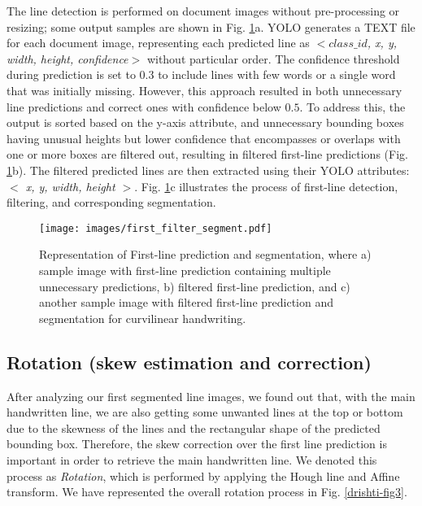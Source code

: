 \documentclass[runningheads]{llncs}
\begin{document}
The line detection is performed on document images without pre-processing or resizing; some output samples are shown in Fig. \ref{drishti-fig2}a. YOLO generates a TEXT file for each document image, representing each predicted line as \textit{$<$$class\_id$, x, y, width, height, confidence$>$} without particular order. The confidence threshold during prediction is set to $0.3$ to include lines with few words or a single word that was initially missing. However, this approach resulted in both unnecessary line predictions and correct ones with confidence below $0.5$. To address this, the output is sorted based on the y-axis attribute, and unnecessary bounding boxes having unusual heights but lower confidence that encompasses or overlaps with one or more boxes are filtered out, resulting in filtered first-line predictions (Fig. \ref{drishti-fig2}b). The filtered predicted lines are then extracted using their YOLO attributes: \textit{$<$ x, y, width, height $>$}. Fig. \ref{drishti-fig2}c illustrates the process of first-line detection, filtering, and corresponding segmentation.

\begin{figure}
\texttt{[image: images/first\_filter\_segment.pdf]}
\vspace{-4mm}
\caption{Representation of First-line prediction and segmentation, where a) sample image with first-line prediction containing multiple unnecessary predictions, b) filtered first-line prediction, and c) another sample image with filtered first-line prediction and segmentation for curvilinear handwriting.}
\label{drishti-fig2}
\vspace{-4mm}
\end{figure}


\vspace{-4mm}
\subsection{Rotation (skew estimation and correction)}
\label{sec_4_3}
After analyzing our first segmented line images, we found out that, with the main handwritten line, we are also getting some unwanted lines at the top or bottom due to the skewness of the lines and the rectangular shape of the predicted bounding box. Therefore, the skew correction over the first line prediction is important in order to retrieve the main handwritten line. We denoted this process as \textit{Rotation}, which is performed by applying the Hough line and Affine transform. We have represented the overall rotation process in Fig. \ref{drishti-fig3}.
\end{document}
